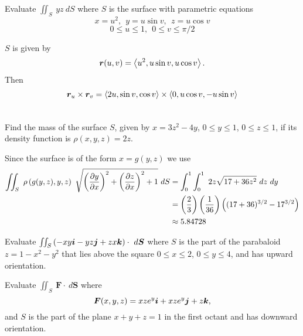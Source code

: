 \documentclass[12pt]{exam}
\begin{document}
\begin{questions}
\newpage 

\question Evaluate \(\iint_S~yz~dS\) where \(S\) is the surface with parametric equations
\[
    x=u^2,~~y=u\sin v,~~z=u\cos v
\]
\[
    0\le u \le 1,~~0\le v\le \pi/2
\]
\ifprintanswers
        \begin{solution}
            \(S\) is given by 
            \[
                \bm{r}(u,v)=\left\langle u^2,u\sin v,u\cos v \right\rangle.
            \]
            Then 
            \begin{align*}
                \bm{r}_u\times \bm{r}_v & = \left\langle 2u,\sin v,\cos v \right\rangle\times \left\langle 0,u\cos v,-u\sin v \right\rangle\\
                    & 
            \end{align*}
        \end{solution}
    \else
        \vfill
    \fi

\question Find the mass of the surface \(S\), given by \(x=3z^2-4y\), \(0\le y \le 1\), \(0\le z \le 1\), if its density function is \(\rho(x,y,z)=2z\).
\ifprintanswers
        \begin{solution}
            
                Since the surface is of the form \(x=g(y,z)\) we use
                \begin{align*}
                    \iint_S~\rho\left(g(y,z),y,z\right)~\sqrt{\left(\dfrac{\partial y}{\partial x}\right)^2+\left(\dfrac{\partial z}{\partial x}\right)^2+1}~dS & = \int_0^1\int_0^1~2z\sqrt{17+36z^2}~dz~dy\\
                        & = \left(\frac{2}{3}\right) \left(\frac{1}{36}\right) \left((17+36)^{3/2} - 17^{3/2} \right)\\
                        & \approx 5.84728
                \end{align*}
        \end{solution}
    \else
        \vfill
    \fi

    \newpage

\question Evaluate \(\iint_S\left(-xy\bm{i}-yz\bm{j}+zx\bm{k}\right)\cdot~d\bm{S}\) where 
\(S\) is the part of the parabaloid \(z=1-x^2-y^2\) that lies above the square \(0\le x \le 2\), \(0\le y \le 4\), and has upward orientation.
\ifprintanswers
        \begin{solution}
        \end{solution}
    \else
        \vfill
    \fi

\question Evaluate \(\iint_S~\bm{F}\cdot ~d\bm{S}\) where
\[
    \bm{F}(x,y,z) = xze^y\bm{i} + xze^y \bm{j} +z \bm{k},
\]
and \(S\) is the part of the plane \(x+y+z=1\) in the first octant and has downward orientation.
\ifprintanswers
        \begin{solution}
        \end{solution}
    \else
        \vfill
    \fi 




\end{questions}
\end{document}

